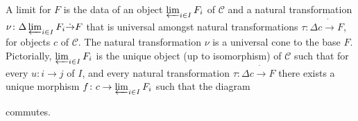 \documentclass[10pt]{amsart}
\begin{document}
\begin{defn}[Limit]
  A limit for $F$ is the data of an object $\varprojlim_{i \in I}F_i$ of $\mathcal{C}$ and a natural transformation $\nu \colon \Delta \varprojlim_{i \in I}F_i \dot{\rightarrow} F$ that is universal amongst natural transformations $\tau \colon \Delta c \dot{\rightarrow} F$, for objects $c$ of $\mathcal{C}$.
  The natural transformation $\nu$ is a universal cone to the base $F$.
  Pictorially, $\varprojlim_{i \in I}F_i$ is the unique object (up to isomorphism) of $\mathcal{C}$ such that for every $u \colon i \rightarrow j$ of $I$, and every natural transformation $\tau \colon \Delta c \dot{\rightarrow} F$ there exists a unique morphism $f \colon c \rightarrow \varprojlim_{i \in I}F_i$ such that the diagram
  \begin{center}
  \end{center}
  commutes.
\end{defn}

\end{document}
